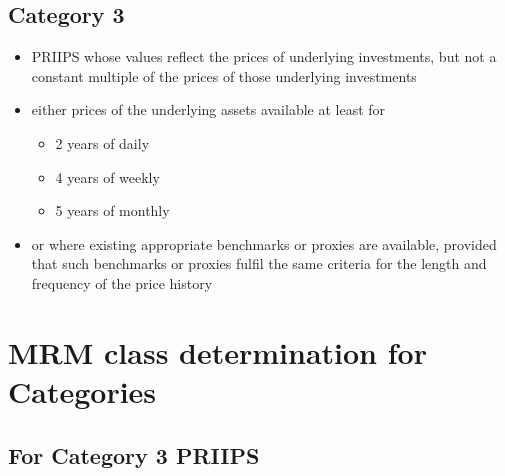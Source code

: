 \documentclass{report}
\begin{document}
\subsection{Category 3}
\begin{itemize}
	\item PRIIPS whose values reflect the prices of underlying investments, but not a constant multiple of the prices of those underlying investments
	\item either prices of the underlying assets available at least for
	\begin{itemize}
		\item 2 years of daily 
		\item 4 years of weekly
		\item 5 years of monthly
	\end{itemize}
	\item or where existing appropriate benchmarks or proxies are available, provided that such benchmarks or proxies fulfil the same criteria for the length and frequency of the price history 
\end{itemize}

\section{MRM class determination for Categories}

\subsection{For Category 3 PRIIPS}
\end{document}

